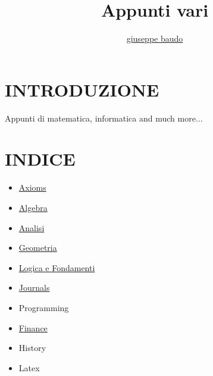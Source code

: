 \documentclass[a4paper,10pt]{article}
\title{Appunti vari}
\author{\href{http://www.baudo.hol.es}{giuseppe baudo}}
\begin{document}
\maketitle

\section{INTRODUZIONE}
Appunti di matematica, informatica and much more...

\section{INDICE}
\begin{itemize}
  \item \href{./axioms/Axioms.html}{Axioms}
  \item \href{./algebra/AlgebraIndex.html}{Algebra}
  \item \href{./analisi/Analisi.html}{Analisi} 
  \item \href{./geometria/Geometria.html}{Geometria} 
  \item \href{./logica/Logics.html}{Logica e Fondamenti}
  \item \href{./misc/Journals.html}{Journals}
  \item Programming
  \item \href{./finance/finance.html}{Finance} 
  \item History 
  \item Latex 
  
\end{itemize}
\end{document}
